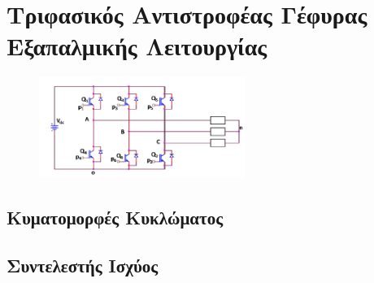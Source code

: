 \section{Τριφασικός Αντιστροφέας Γέφυρας Εξαπαλμικής Λειτουργίας}




\begin{figure}[H]
    \centering
    \includegraphics[width=0.6\textwidth]{Images/circuit2.png}
    \label{circuit_2}
\end{figure}


\subsection{Κυματομορφές Κυκλώματος}





\subsection{Συντελεστής Ισχύος}